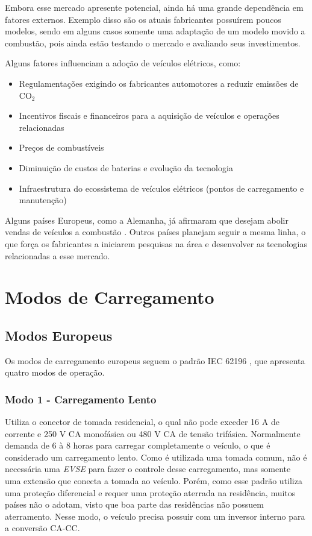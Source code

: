     Embora esse mercado apresente potencial, ainda há uma grande dependência em fatores externos. Exemplo disso são os atuais fabricantes possuírem poucos modelos, sendo em alguns casos somente uma adaptação de um modelo movido a combustão, pois ainda estão testando o mercado e avaliando seus investimentos.

    Alguns fatores influenciam a adoção de veículos elétricos, como:

    \begin{itemize}
      \item Regulamentações exigindo os fabricantes automotores a reduzir emissões de CO$_2$
      \item Incentivos fiscais e financeiros para a aquisição de veículos e operações relacionadas
      \item Preços de combustíveis
      \item Diminuição de custos de baterias e evolução da tecnologia
      \item Infraestrutura do ecossistema de veículos elétricos (pontos de carregamento e manutenção)
    \end{itemize}

    Alguns países Europeus, como a Alemanha, já afirmaram que desejam abolir vendas de veículos a combustão \cite{forbes-news-germany}. Outros países planejam seguir a mesma linha, o que força os fabricantes a iniciarem pesquisas na área e desenvolver as tecnologias relacionadas a esse mercado.

  \section{Modos de Carregamento}
  \label{stateofart:modes}

    \subsection{Modos Europeus}
    \label{stateofart:modes:europe}

      Os modos de carregamento europeus seguem o padrão IEC 62196 \cite{iec-62196}, que apresenta quatro modos de operação.

        \subsubsection{Modo 1 - Carregamento Lento}
        \label{stateofart:modes:europe:mode1}

        Utiliza o conector de tomada residencial, o qual não pode exceder 16 A de corrente e 250 V \ac{CA} monofásica ou 480 V \ac{CA} de tensão trifásica. Normalmente demanda de 6 à 8 horas para carregar completamente o veículo, o que é considerado um carregamento lento. Como é utilizada uma tomada comum, não é necessária uma \textit{\ac{EVSE}} para fazer o controle desse carregamento, mas somente uma extensão que conecta a tomada ao veículo. Porém, como esse padrão utiliza uma proteção diferencial e requer uma proteção aterrada na residência, muitos países não o adotam, visto que boa parte das residências não possuem aterramento. Nesse modo, o veículo precisa possuir com um inversor interno para a conversão \ac{CA}-\ac{CC}.

